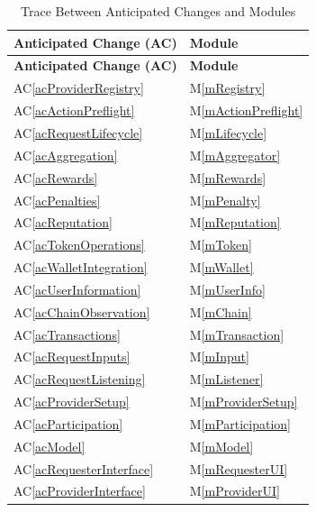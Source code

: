 \documentclass[12pt, titlepage]{article}
\newcommand{\acref}[1]{AC\ref{#1}}
\newcommand{\mref}[1]{M\ref{#1}}
\begin{document}
\begin{longtable}{|p{}|p{}|}
\caption{Trace Between Anticipated Changes and Modules}
\label{TblACT} \\
\hline
\textbf{Anticipated Change (AC)} & \textbf{Module} \\
\hline
\endfirsthead

\hline
\textbf{Anticipated Change (AC)} & \textbf{Module} \\
\hline
\endhead

\hline
\endfoot

\acref{acProviderRegistry} & \mref{mRegistry} \\
\hline
\acref{acActionPreflight} & \mref{mActionPreflight} \\
\hline
\acref{acRequestLifecycle} & \mref{mLifecycle} \\
\hline
\acref{acAggregation} & \mref{mAggregator} \\
\hline
\acref{acRewards} & \mref{mRewards} \\
\hline
\acref{acPenalties} & \mref{mPenalty} \\
\hline
\acref{acReputation} & \mref{mReputation} \\
\hline
\acref{acTokenOperations} & \mref{mToken} \\
\hline
\acref{acWalletIntegration} & \mref{mWallet} \\
\hline
\acref{acUserInformation} & \mref{mUserInfo} \\
\hline
\acref{acChainObservation} & \mref{mChain} \\
\hline
\acref{acTransactions} & \mref{mTransaction} \\
\hline
\acref{acRequestInputs} & \mref{mInput} \\
\hline
\acref{acRequestListening} & \mref{mListener} \\
\hline
\acref{acProviderSetup} & \mref{mProviderSetup} \\
\hline
\acref{acParticipation} & \mref{mParticipation} \\
\hline
\acref{acModel} & \mref{mModel} \\
\hline
\acref{acRequesterInterface} & \mref{mRequesterUI} \\
\hline
\acref{acProviderInterface} & \mref{mProviderUI} \\
\hline

\end{longtable}
\end{document}
